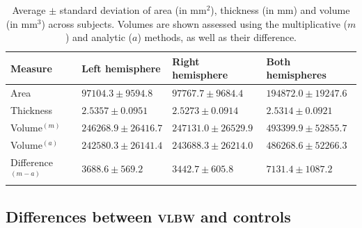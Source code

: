 \begin{table}[!tp]
\caption{Average $\pm$ standard deviation of area (in mm$^2$), thickness (in mm) and volume (in mm$^3$) across subjects. Volumes are shown assessed using the multiplicative ($m$) and analytic ($a$) methods, as well as their difference.}
{\small
\begin{center}
\hspace*{-0mm}\begin{tabular}{@{}llll@{}}
\toprule
Measure               & Left hemisphere      & Right hemisphere     & Both hemispheres\\ 
\midrule
Area                  & $97104.3 \pm 9594.8$   & $97767.7 \pm 9684.4$   & $194872.0 \pm 19247.6$\\
Thickness             & $2.5357 \pm 0.0951$    & $2.5273 \pm 0.0914$    & $2.5314 \pm 0.0921$\\
Volume$^{(m)}$        & $246268.9 \pm 26416.7$ & $247131.0 \pm 26529.9$ & $493399.9 \pm 52855.7$\\
Volume$^{(a)}$        & $242580.3 \pm 26141.4$ & $243688.3 \pm 26214.0$ & $486268.6 \pm 52266.3$\\
Difference$^{(m-a)}$  & $3688.6 \pm 569.2$     & $3442.7 \pm 605.8$     & $7131.4 \pm 1087.2$\\
\bottomrule   
\end{tabular}
\end{center}}
\label{tab:global}
\end{table}

\begin{figure}[!p]
\end{figure}

\subsection{Differences between \textsc{vlbw} and controls}

